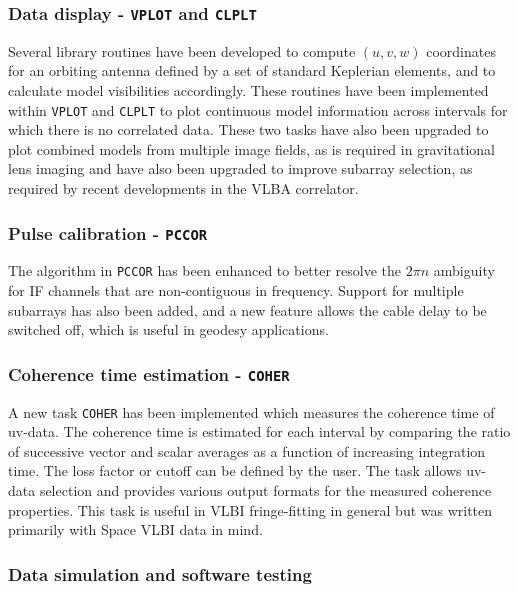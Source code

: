 \subsubsection{Data display - {\tt VPLOT} and {\tt CLPLT}}

 Several library routines have been developed to compute $(u,v,w)$
coordinates for an orbiting antenna defined by a set of standard Keplerian
elements, and to calculate model visibilities accordingly. These
routines have been implemented within {\tt VPLOT} and {\tt CLPLT} to
plot continuous model information across intervals for which there is
no correlated data. These two tasks have also been upgraded to plot
combined models from multiple image fields, as is required in
gravitational lens imaging and have also been upgraded to improve
subarray selection, as required by recent developments in the VLBA
correlator.

\subsubsection{Pulse calibration - {\tt PCCOR}}

The algorithm in {\tt PCCOR} has been enhanced to better resolve the
$2 \pi n$ ambiguity for IF channels that are non-contiguous in
frequency. Support for multiple subarrays has also been added, and a
new feature allows the cable delay to be switched off, which is useful
in geodesy applications.

\subsubsection{Coherence time estimation - {\tt COHER}}

A new task {\tt COHER} has been implemented which measures the
coherence time of uv-data. The coherence time is estimated for each
interval by comparing the ratio of successive vector and scalar
averages as a function of increasing integration time. The loss factor
or cutoff can be defined by the user. The task allows uv-data
selection and provides various output formats for the measured
coherence properties. This task is useful in VLBI fringe-fitting in general
but was written primarily with Space VLBI data in mind.

\subsubsection{Data simulation and software testing}

